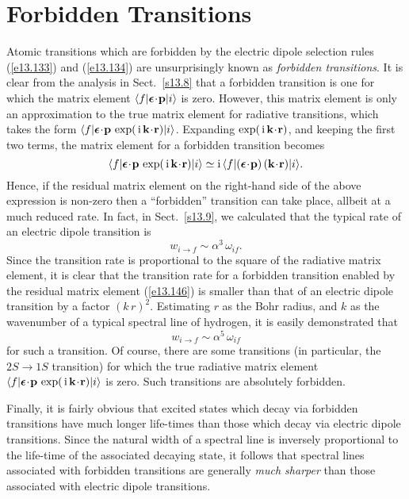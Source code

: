 \section{Forbidden Transitions}
Atomic transitions which are forbidden by the electric dipole selection rules (\ref{e13.133})
and (\ref{e13.134}) are unsurprisingly known as {\em forbidden transitions}. 
It is clear from the analysis in Sect.~\ref{s13.8} that a forbidden
transition is one for which the matrix element $\langle f|\mbox{\boldmath$\epsilon$}\!\cdot\!{\bf p}|i\rangle$ is zero. However, this matrix element is only an approximation
to the true matrix element for radiative transitions, which
takes the form $\langle f|\mbox{\boldmath$\epsilon$}\!\cdot\!{\bf p}\,\exp(\,{\rm i}\,{\bf k}\!\cdot\!{\bf r})|i\rangle$. Expanding $\exp(\,{\rm i}\,{\bf k}\!\cdot\!{\bf r})$,
and keeping the first two terms, the matrix element for a forbidden
transition becomes
\begin{equation}\label{e13.146}
\langle f|\bepsilon\!\cdot\!{\bf p}\,\exp(\,{\rm i}\,{\bf k}\!\cdot\!{\bf r})|i\rangle \simeq {\rm i}\,\langle f|(\bepsilon\!\cdot\!{\bf p})\,({\bf k}\!\cdot\!{\bf r})|i\rangle.
\end{equation}
Hence, if the residual matrix element on the right-hand side of the above expression
is non-zero then a ``forbidden'' transition can take place, allbeit at
a much reduced rate. In fact, in Sect.~\ref{s13.9},  we calculated that the
typical rate of an electric dipole transition is
\begin{equation}
w_{i\rightarrow f} \sim \alpha^3\,\omega_{if}.
\end{equation}
Since the transition rate is proportional to the square of the radiative matrix element, it is clear that the transition rate for a forbidden
transition enabled by the residual matrix element (\ref{e13.146}) is smaller than that of an electric dipole transition by
a factor $(k\,r)^2$. Estimating $r$ as the Bohr radius, and $k$
as the wavenumber of a typical spectral line of hydrogen, it is
easily demonstrated that
\begin{equation}
w_{i\rightarrow f} \sim \alpha^5\,\omega_{if}
\end{equation}
for such a transition.
Of course, there are some transitions (in particular, the $2S\rightarrow 1S$
transition) for which the true radiative matrix element  $\langle f|\mbox{\boldmath$\epsilon$}\!\cdot\!{\bf p}\,\exp(\,{\rm i}\,{\bf k}\!\cdot\!{\bf r})|i\rangle$ is
zero. Such transitions are absolutely forbidden.

Finally, it is fairly obvious that excited states which decay via forbidden transitions
 have much longer life-times than those which decay
via electric dipole transitions. Since the natural width of a spectral line
is inversely proportional to the life-time of the associated decaying state, it follows
that spectral lines associated with forbidden transitions are generally {\em much sharper}\/ than those
associated with electric dipole transitions.